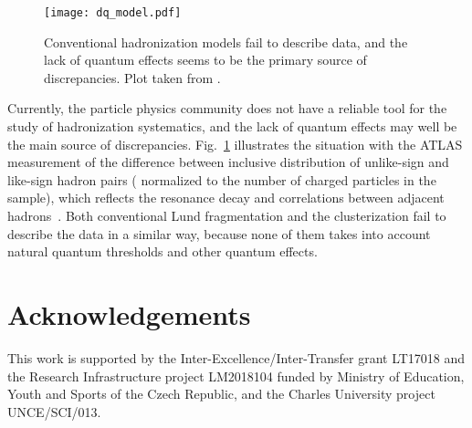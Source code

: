 \documentclass[Physsubmission, Phys]{SciPost}
\begin{document}
 \begin{figure}[h]
\centering
\texttt{[image: dq\_model.pdf]}
\caption{Conventional hadronization models fail to describe data, and
  the lack of quantum effects seems to be the primary source of discrepancies. Plot taken from \cite{ATLAS-chains}.
\label{fig:dq}} 
\end{figure}
 

    Currently, the particle physics community does not have a reliable
    tool for the study of hadronization systematics, and the lack of
    quantum effects may well be the main source of discrepancies.
    Fig.~\ref{fig:dq} illustrates the situation with the ATLAS measurement of
   the  difference between inclusive distribution of unlike-sign and like-sign hadron pairs 
   ( normalized to the number of charged particles in the sample),
   which reflects the resonance decay and correlations between
   adjacent hadrons~\cite{ATLAS-chains}. Both conventional Lund fragmentation and the
   clusterization fail to describe the data in a similar way, because
   none of them takes into account natural quantum thresholds and other quantum effects.


\section*{Acknowledgements}
This work is supported by the Inter-Excellence/Inter-Transfer grant LT17018 and the Research Infrastructure project LM2018104
 funded by Ministry of Education, Youth and Sports of the Czech Republic, and the Charles University project UNCE/SCI/013.
\end{document}
